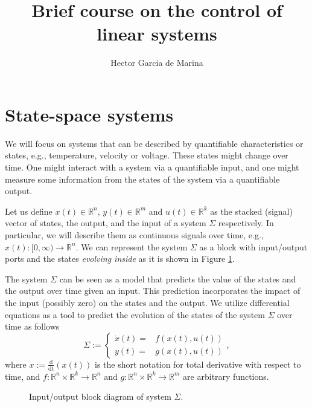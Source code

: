 \documentclass[11pt,a4paper,titlepage]{article}
\title{Brief course on the control of linear systems}
\author{Hector Garcia de Marina}
\begin{document}
\maketitle
\tableofcontents
\newpage
\section{State-space systems}
We will focus on systems that can be described by quantifiable characteristics or states, e.g., temperature, velocity or voltage. These states might change over time. One might interact with a system via a quantifiable input, and one might measure some information from the states of the system via a quantifiable output.

Let us define $x(t)\in\mathbb{R}^n$, $y(t)\in\mathbb{R}^m$ and $u(t)\in\mathbb{R}^k$ as the stacked (signal) vector of states, the output, and the input of a system $\Sigma$ respectively. In particular, we will describe them as continuous signals over time, e.g., $x(t) :[0,\infty) \to \mathbb{R}^n$. We can represent the system $\Sigma$ as a block with input/output ports and the states \emph{evolving inside} as it is shown in Figure \ref{fig: sigma}.

The system $\Sigma$ can be seen as a model that predicts the value of the states and the output over time given an input. This prediction incorporates the impact of the input (possibly zero) on the states and the output. We utilize differential equations as a tool to predict the evolution of the states of the system $\Sigma$ over time as follows
\begin{equation}
	\Sigma := \begin{cases}
		\dot x(t) =& f(x(t),u(t)) \\ y(t) =& g(x(t),u(t))
	\end{cases}, 
\label{eq: sigma}
\end{equation}
where $\dot x := \frac{\mathrm{d}}{\mathrm{dt}}(x(t))$ is the short notation for total derivative with respect to time, and $f: \mathbb{R}^n \times \mathbb{R}^k \to \mathbb{R}^n$ and $g: \mathbb{R}^n \times \mathbb{R}^k \to \mathbb{R}^m$ are arbitrary functions.



\begin{figure}[!h]
\centering
{}
	\caption{Input/output block diagram of system $\Sigma$.}
	\label{fig: sigma}
\end{figure}
\end{document}
